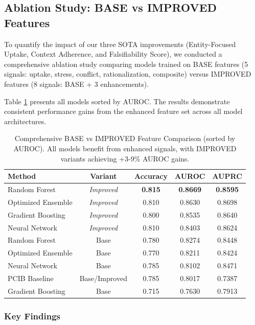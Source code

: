 \documentclass[11pt,letterpaper]{article}
\begin{document}
\subsection{Ablation Study: BASE vs IMPROVED Features}
To quantify the impact of our three SOTA improvements (Entity-Focused Uptake, Context Adherence, and Falsifiability Score), we conducted a comprehensive ablation study comparing models trained on BASE features (5 signals: uptake, stress, conflict, rationalization, composite) versus IMPROVED features (8 signals: BASE + 3 enhancements).

Table \ref{tab:ablation} presents all models sorted by AUROC. The results demonstrate consistent performance gains from the enhanced feature set across all model architectures.

\begin{table}[H]
\centering
\small
\caption{Comprehensive BASE vs IMPROVED Feature Comparison (sorted by AUROC). All models benefit from enhanced signals, with IMPROVED variants achieving +3-9\% AUROC gains.}
\label{tab:ablation}
\begin{tabular}{lcccc}
\toprule
\textbf{Method} & \textbf{Variant} & \textbf{Accuracy} & \textbf{AUROC} & \textbf{AUPRC} \\
\midrule
\rowcolor{lightgray} Random Forest & \textit{Improved} & \textbf{0.815} & \textbf{0.8669} & \textbf{0.8595} \\
Optimized Ensemble & \textit{Improved} & 0.810 & 0.8630 & 0.8698 \\
Gradient Boosting & \textit{Improved} & 0.800 & 0.8535 & 0.8640 \\
Neural Network & \textit{Improved} & 0.810 & 0.8403 & 0.8624 \\
\midrule
Random Forest & Base & 0.780 & 0.8274 & 0.8448 \\
Optimized Ensemble & Base & 0.770 & 0.8211 & 0.8424 \\
Neural Network & Base & 0.785 & 0.8102 & 0.8471 \\
PCIB Baseline & Base/Improved & 0.785 & 0.8017 & 0.7387 \\
Gradient Boosting & Base & 0.715 & 0.7630 & 0.7913 \\
\bottomrule
\end{tabular}
\end{table}

\subsubsection{Key Findings}
\end{document}
